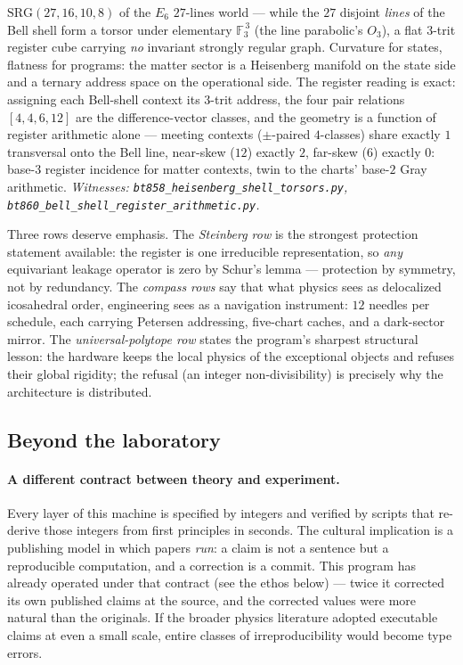 \documentclass[11pt]{article}
\newcommand{\GF}[1]{\mathbb{F}_{#1}}
\begin{document}
$\mathrm{SRG}(27,16,10,8)$ of the $E_6$ $27$-lines world --- while
the $27$ disjoint \emph{lines} of the Bell shell form a torsor under
elementary $\GF3^{\,3}$ (the line parabolic's $O_3$), a flat
$3$-trit register cube carrying \emph{no} invariant strongly regular
graph.  Curvature for states, flatness for programs: the matter
sector is a Heisenberg manifold on the state side and a ternary
address space on the operational side.  The register reading is
exact: assigning each Bell-shell context its $3$-trit address, the
four pair relations $[4,4,6,12]$ are the difference-vector classes,
and the geometry is a function of register arithmetic alone ---
meeting contexts ($\pm$-paired $4$-classes) share exactly $1$
transversal onto the Bell line, near-skew ($12$) exactly $2$,
far-skew ($6$) exactly $0$: base-$3$ register incidence for matter
contexts, twin to the charts' base-$2$ Gray arithmetic.
\emph{Witnesses: \texttt{bt858\_heisenberg\_shell\_torsors.py},
\texttt{bt860\_bell\_shell\_register\_arithmetic.py}.}

Three rows deserve emphasis.  The \emph{Steinberg row} is the
strongest protection statement available: the register is one
irreducible representation, so \emph{any} equivariant leakage
operator is zero by Schur's lemma --- protection by symmetry, not by
redundancy.  The \emph{compass rows} say that what physics sees as
delocalized icosahedral order, engineering sees as a navigation
instrument: $12$ needles per schedule, each carrying Petersen
addressing, five-chart caches, and a dark-sector mirror.  The
\emph{universal-polytope row} states the program's sharpest
structural lesson: the hardware keeps the local physics of the
exceptional objects and refuses their global rigidity; the refusal
(an integer non-divisibility) is precisely why the architecture is
distributed.

\subsection{Beyond the laboratory}

\paragraph{A different contract between theory and experiment.}
Every layer of this machine is specified by integers and verified by
scripts that re-derive those integers from first principles in
seconds.  The cultural implication is a publishing model in which
papers \emph{run}: a claim is not a sentence but a reproducible
computation, and a correction is a commit.  This program has already
operated under that contract (see the ethos below) --- twice it
corrected its own published claims at the source, and the corrected
values were more natural than the originals.  If the broader physics
literature adopted executable claims at even a small scale, entire
classes of irreproducibility would become type errors.
\end{document}
